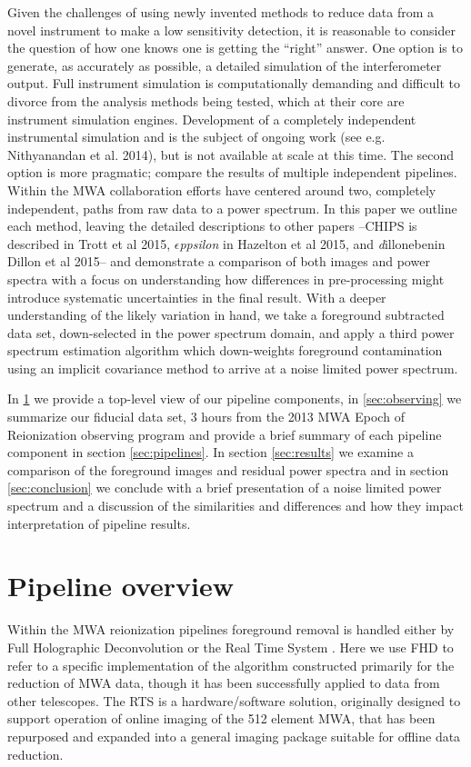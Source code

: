 \documentclass[preprint]{aastex}
\def\eppsilon{{\it $\epsilon$ppsilon }}
\def\implicitcov{{\emph dilloneben}}
\def\chipscite{Trott et al 2015}
\def\eppsiloncite{Hazelton et al 2015}
\def\dilloncite{Dillon et al 2015}
\begin{document}
Given the challenges of using newly invented methods to reduce data from a novel instrument to make a low sensitivity detection, it is reasonable to consider the question of how one knows one is getting the ``right'' answer.  One option is to generate, as accurately as possible, a detailed simulation of the interferometer output. Full instrument simulation is computationally demanding and difficult to divorce from the analysis methods being tested, which at their core are instrument simulation engines. Development of a completely independent instrumental simulation and is the subject of ongoing work (see e.g. Nithyanandan et al. 2014), but is not available at scale at this time.  The second option is more pragmatic; compare the results of multiple independent pipelines.  Within the MWA collaboration efforts have centered around two, completely independent, paths from raw data to a power spectrum.  In this paper we outline each method, leaving the detailed descriptions to other papers --CHIPS is described in \chipscite, \eppsilon in \eppsiloncite, and \implicitcov in \dilloncite--  and demonstrate a comparison of both images and power spectra with a focus on understanding how differences in pre-processing might introduce systematic uncertainties in the final result. With a deeper understanding of the likely variation in hand, we take a foreground subtracted data set, down-selected in the power spectrum domain, and apply a third power spectrum estimation algorithm which down-weights foreground contamination using an implicit covariance method to arrive at a noise limited power spectrum.



In \ref{sec:overview} we provide a top-level view of our pipeline components, in \ref{sec:observing} we summarize  our fiducial data set, 3 hours from the 2013 MWA Epoch of Reionization observing program and provide a brief summary of each pipeline component in section \ref{sec:pipelines}. In section \ref{sec:results} we examine a comparison of the foreground images and residual power spectra and in section \ref{sec:conclusion} we conclude with a brief presentation of a noise limited power spectrum and a discussion of the similarities and differences and how they impact interpretation of pipeline results.

\section{Pipeline overview}
\label{sec:overview}
Within the MWA reionization pipelines foreground removal is handled either by Full Holographic Deconvolution \citep[FHD]{Sullivan:2012p9457} or the Real Time System \citep[RTS]{Ord:2010p8442}.  Here we use FHD to refer to a specific implementation of the algorithm constructed primarily for the reduction of MWA data, though it has been successfully applied to data from other telescopes.  The RTS is a hardware/software solution, originally designed to support operation of online imaging of the 512 element MWA, that has been repurposed and expanded into a general imaging package suitable for offline data reduction.
\end{document}

